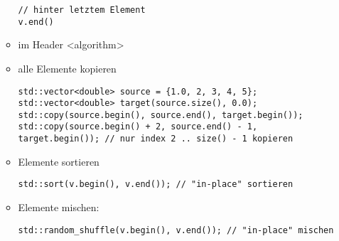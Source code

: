 \documentclass[a4paper]{scrartcl}
\theoremstyle{definition}
\theoremstyle{plain}
\theoremstyle{remark}
\theoremstyle{remark}
\begin{document}
\begin{itemize}
\begin{itemize}
\begin{verbatim}
// hinter letztem Element
v.end()
\end{verbatim}
\item im Header <algorithm>
\item alle Elemente kopieren
\begin{verbatim}
std::vector<double> source = {1.0, 2, 3, 4, 5};
std::vector<double> target(source.size(), 0.0);
std::copy(source.begin(), source.end(), target.begin());
std::copy(source.begin() + 2, source.end() - 1, target.begin()); // nur index 2 .. size() - 1 kopieren
\end{verbatim}
\item Elemente sortieren
\begin{verbatim}
std::sort(v.begin(), v.end()); // "in-place" sortieren
\end{verbatim}
\item Elemente mischen:
\begin{verbatim}
std::random_shuffle(v.begin(), v.end()); // "in-place" mischen
\end{verbatim}
\end{itemize}
\end{itemize}
\end{document}
